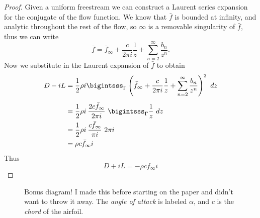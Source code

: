 \documentclass[letterpaper, twoside, 12 pt]{article}
\begin{document}
\begin{proof}
		Given a uniform freestream we can construct a Laurent series expansion for the conjugate of the flow function.
		We know that $\bar f$ is bounded at infinity, and analytic throughout the rest of the flow, so $\infty$ is a removable singularity of $\bar f$, thus we can write
		\[
			\bar f = \bar f_\infty + \frac{c}{2 \pi i} \frac{1}{z} + \sum_{n=2}^\infty \frac{b_n}{z^n}.
		\]
		Now we substitute in the Laurent expansion of $\bar f$ to obtain
		\begin{align*}
			D - iL &= \frac{1}{2} \rho i \bigintsss_\Gamma \left( \bar f_\infty + \frac{c}{2 \pi i} \frac{1}{z} + \sum_{n=2}^\infty \frac{b_n}{z^n} \right)^2 \ dz \\[1 ex]
			&= \frac{1}{2} \rho i \> \frac{2 c \bar f_\infty}{2 \pi i} \ \bigintsss_\Gamma \frac{1}{z} \ dz \\
			&= \frac{1}{2} \rho i \> \frac{c \bar f_\infty}{\pi i} \ 2 \pi i \\
			&= \rho c \bar f_\infty i
		\end{align*}
		Thus
		\[
			D + iL = - \rho c f_\infty i
		\]
	\end{proof}

\clearpage
\nocite{*}


\clearpage
\begin{figure}[H]
	\centering
	\begin{tikzpicture}
		
	\end{tikzpicture}
	\caption{
		Bonus diagram!
		I made this before starting on the paper and didn't want to throw it away.
		The \textit{angle of attack} is labeled $\alpha$, and $c$ is the \textit{chord} of the airfoil.
	}
\end{figure}
\end{document}
